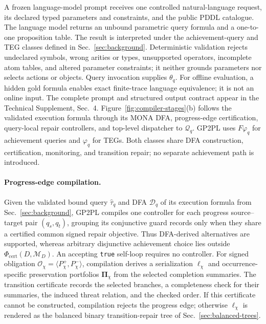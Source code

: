 A frozen language-model prompt receives one controlled natural-language request,
its declared typed parameters and constraints, and the public PDDL catalogue. The
language model returns an unbound parametric \ltlf{} query formula and a
one-to-one proposition table. The result is interpreted under
the achievement-query and TEG classes defined in Sec.~\ref{sec:background}.
Deterministic validation rejects
undeclared symbols, wrong arities or types, unsupported operators, incomplete
atom tables, and altered parameter constraints; it neither grounds parameters
nor selects actions or objects. Query invocation supplies $\theta_q$. For
offline evaluation, a hidden gold formula enables exact finite-trace language
equivalence; it is not an online input. The complete prompt and structured output
contract appear in the Technical Supplement, Sec.~4. Figure~\ref{fig:compiler-stages}(b)
follows the validated execution formula through its MONA DFA, progress-edge
certification, query-local repair controllers, and top-level dispatcher to
$\mathcal Q_q$. GP2PL uses $F\varphi_q$ for achievement queries and $\varphi_q$
for TEGs. Both classes share DFA construction, certification, monitoring, and
transition repair; no separate achievement path is introduced.

\paragraph{Progress-edge compilation.}
Given the validated bound query $\widehat\tau_q$ and DFA $\mathcal D_q$ of its
execution formula from Sec.~\ref{sec:background}, GP2PL compiles one controller
for each progress source--target pair $(q_s,q_t)$, grouping its conjunctive guard
records only when they share a certified common signed repair objective. Thus
DFA-derived alternatives are supported, whereas arbitrary disjunctive achievement
choice lies outside $\Phi_{\mathrm{cert}}(D,\mathcal M_D)$. An accepting
\texttt{true} self-loop requires no controller. For signed obligation
$\mathcal O_\chi=\langle P_\chi^+,P_\chi^-\rangle$, compilation derives a
serialization $\boldsymbol\ell_\chi$ and occurrence-specific preservation
portfolios $\boldsymbol\Pi_\chi$ from the selected completion summaries. The
transition certificate records the selected branches, a completeness check for
their summaries, the induced threat relation, and the checked order. If
this certificate cannot be constructed, compilation rejects the progress edge;
otherwise $\boldsymbol\ell_\chi$ is rendered as the balanced binary
transition-repair tree of Sec.~\ref{sec:balanced-trees}.

